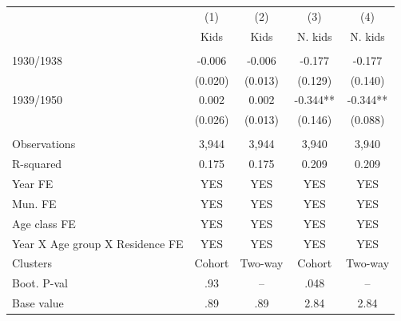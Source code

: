 \begin{tabular}{lcccc} \hline
 & (1) & (2) & (3) & (4) \\
 & Kids & Kids & N. kids & N. kids \\ \hline
 &  &  &  &  \\
1930/1938 & -0.006 & -0.006 & -0.177 & -0.177 \\
 & (0.020) & (0.013) & (0.129) & (0.140) \\
1939/1950 & 0.002 & 0.002 & -0.344** & -0.344** \\
 & (0.026) & (0.013) & (0.146) & (0.088) \\
 &  &  &  &  \\
Observations & 3,944 & 3,944 & 3,940 & 3,940 \\
R-squared & 0.175 & 0.175 & 0.209 & 0.209 \\
Year FE & YES & YES & YES & YES \\
Mun. FE & YES & YES & YES & YES \\
Age class FE & YES & YES & YES & YES \\
Year X Age group X Residence FE & YES & YES & YES & YES \\
Clusters & Cohort & Two-way & Cohort & Two-way \\
Boot. P-val & .93 & -- & .048 & -- \\
 Base value & .89 & .89 & 2.84 & 2.84 \\ \hline
\end{tabular}
